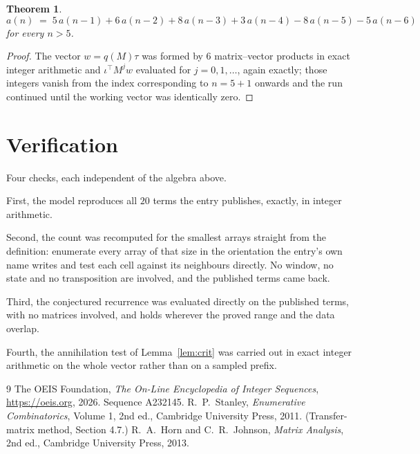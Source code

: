 \documentclass[11pt,a4paper]{article}
\theoremstyle{plain}
\newtheorem{theorem}{Theorem}
\theoremstyle{definition}
\begin{document}
\begin{theorem}
\[
a(n)\;=\;5\,a(n-1) + 6\,a(n-2) + 8\,a(n-3) + 3\,a(n-4) - 8\,a(n-5) - 5\,a(n-6)
\]
for every $n>5$.
\end{theorem}

\begin{proof}
The vector $w=q(M)\tau$ was formed by $6$ matrix--vector products in exact integer
arithmetic and $\iota^{\!\top}M^{j}w$ evaluated for $j=0,1,\dots$, again exactly; those
integers vanish from the index corresponding to $n=5+1$ onwards and the run continued
until the working vector was identically zero.
\end{proof}

\section{Verification}

Four checks, each independent of the algebra above.

First, the model reproduces all $20$ terms the entry publishes, exactly, in integer
arithmetic.

Second, the count was recomputed for the smallest arrays straight from the definition:
enumerate every array of that size in the orientation the entry's own name writes and test each
cell against its neighbours directly. No window, no state and no transposition are involved,
and the published terms came back.

Third, the conjectured recurrence was evaluated directly on the published terms, with no
matrices involved, and holds wherever the proved range and the data overlap.

Fourth, the annihilation test of Lemma~\ref{lem:crit} was carried out in exact integer
arithmetic on the whole vector rather than on a sampled prefix.

\begin{thebibliography}{9}
 The OEIS Foundation, \emph{The On-Line Encyclopedia of Integer
Sequences}, \url{https://oeis.org}, 2026. Sequence A232145.
 R.~P.~Stanley, \emph{Enumerative Combinatorics}, Volume 1, 2nd ed.,
Cambridge University Press, 2011. (Transfer-matrix method, Section 4.7.)
 R.~A.~Horn and C.~R.~Johnson, \emph{Matrix Analysis}, 2nd ed., Cambridge
University Press, 2013.
\end{thebibliography}
\end{document}
